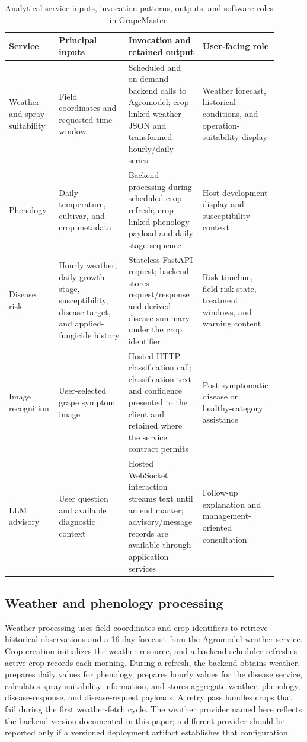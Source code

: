 \documentclass[12pt]{article}
\newcommand{\tablefontsize}{\fontsize{9pt}{11pt}\selectfont}
\begin{document}
\begin{table}[H]
\centering
\caption[Analytical-service integration in GrapeMaster]{Analytical-service inputs, invocation patterns, outputs, and software roles in GrapeMaster.}
\label{tab:module_provenance}
\tablefontsize
\begin{tabular}{@{}p{0.16\linewidth} p{0.25\linewidth} p{0.22\linewidth} p{0.27\linewidth}@{}}
\toprule
Service & Principal inputs & Invocation and retained output & User-facing role \\
\midrule
Weather and spray suitability & Field coordinates and requested time window & Scheduled and on-demand backend calls to Agromodel; crop-linked weather JSON and transformed hourly/daily series & Weather forecast, historical conditions, and operation-suitability display \\
Phenology & Daily temperature, cultivar, and crop metadata & Backend processing during scheduled crop refresh; crop-linked phenology payload and daily stage sequence & Host-development display and susceptibility context \\
Disease risk & Hourly weather, daily growth stage, susceptibility, disease target, and applied-fungicide history & Stateless FastAPI request; backend stores request/response and derived disease summary under the crop identifier & Risk timeline, field-risk state, treatment windows, and warning content \\
Image recognition & User-selected grape symptom image & Hosted HTTP classification call; classification text and confidence presented to the client and retained where the service contract permits & Post-symptomatic disease or healthy-category assistance \\
LLM advisory & User question and available diagnostic context & Hosted WebSocket interaction streams text until an end marker; advisory/message records are available through application services & Follow-up explanation and management-oriented consultation \\
\bottomrule
\end{tabular}
\end{table}

\subsection{Weather and phenology processing}\label{weather-and-phenology-processing}

Weather processing uses field coordinates and crop identifiers to retrieve historical observations and a 16-day forecast from the Agromodel weather service. Crop creation initializes the weather resource, and a backend scheduler refreshes active crop records each morning. During a refresh, the backend obtains weather, prepares daily values for phenology, prepares hourly values for the disease service, calculates spray-suitability information, and stores aggregate weather, phenology, disease-response, and disease-request payloads. A retry pass handles crops that fail during the first weather-fetch cycle. The weather provider named here reflects the backend version documented in this paper; a different provider should be reported only if a versioned deployment artifact establishes that configuration.
\end{document}
